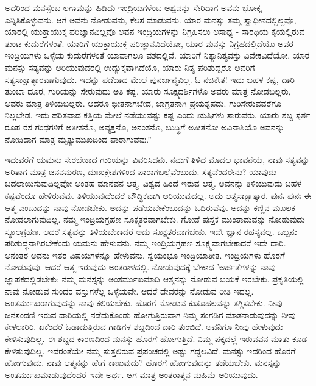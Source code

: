 ಅದರಿಂದ ಮನಸ್ಸೆಂಬ ಲಗಾಮನ್ನು ಹಿಡಿದು ಇಂದ್ರಿಯಗಳೆಂಬ ಅಶ್ವವನ್ನು ಸೇರಿದಾಗ ಅವನು ಭೋಕ್ತೃ ಎನ್ನಿಸಿಕೊಳ್ಳುವನು. ಆಗ ಅವನು ನೋಡುವನು, ಕೆಲಸ ಮಾಡುವನು. ಯಾರ ಮನಸ್ಸು ತಮ್ಮ ಸ್ವಾಧೀನದಲ್ಲಿಲ್ಲವೊ, ಯಾರಲ್ಲಿ ಯುಕ್ತಾಯುಕ್ತ ಪರಿಜ್ಞಾನವಿಲ್ಲವೊ ಅವನ ಇಂದ್ರಿಯಗಳನ್ನು ನಿಗ್ರಹಿಸಲು ಅಸಾಧ್ಯ - ಸಾರಥಿಯ ಕೈಯಲ್ಲಿರುವ ತುಂಟ ಕುದುರೆಗಳಂತೆ. ಯಾರಿಗೆ ಯುಕ್ತಾಯುಕ್ತ ಪರಿಜ್ಞಾನವಿದೆಯೋ, ಯಾರ ಮನಸ್ಸು ನಿಗ್ರಹದಲ್ಲಿದೆಯೊ ಅವರ ಇಂದ್ರಿಯಗಳು ಒಳ್ಳೆಯ ಕುದುರೆಗಳಂತೆ ಯಾವಾಗಲೂ ವಶದಲ್ಲಿವೆ. ಯಾರಿಗೆ ನಿತ್ಯಾನಿತ್ಯವಸ್ತು ವಿವೇಕವಿದೆಯೋ, ಯಾರ ಮನಸ್ಸು ಸತ್ಯವನ್ನು ಅರಿಯುವುದರಲ್ಲಿ ಉದ್ಯುಕ್ತವಾಗಿದೆಯೊ, ಯಾರು ನಿತ್ಯ ಪರಿಶುದ್ದರೊ ಅವರಿಗೆ ಸತ್ಯಸಾಕ್ಷಾತ್ಕಾರವಾಗುವುದು. ಇದನ್ನು ಪಡೆದಾದ ಮೇಲೆ ಪುನರ್ಜನ್ಮವಿಲ್ಲ. ಓ ನಚಿಕೇತ! ಇದು ಬಹಳ ಕಷ್ಟ, ದಾರಿ ತುಂಬಾ ದೂರ, ಗುರಿಯನ್ನು ಸೇರುವುದು ಅತಿ ಕಷ್ಟ. ಯಾರು ಸೂಕ್ಷ್ಮದರ್ಶಿಗಳೊ ಅವರು ಮಾತ್ರ ನೋಡಬಲ್ಲರು, ಅವರು ಮಾತ್ರ ತಿಳಿಯಬಲ್ಲರು. ಆದರೂ ಭೀತನಾಗಬೇಡ, ಜಾಗ್ರತನಾಗಿ ಪ್ರಯತ್ನಪಡು. ಗುರಿಸೇರುವವರೆಗೂ ನಿಲ್ಲಬೇಡ. ಇದು ಹರಿತವಾದ ಕತ್ತಿಯ ಮೇಲೆ ನಡೆಯುವಷ್ಟು ಕಷ್ಟ ಎಂದು ಋಷಿಗಳು ಸಾರುವರು. ಯಾರು ಶಬ್ದ ಸ್ಪರ್ಶ ರೂಪ ರಸ ಗಂಧಗಳಿಗೆ ಅತೀತನೊ, ಅವ್ಯಕ್ತನೊ, ಅನಂತನೊ, ಬುದ್ಧಿಗೆ ಅತೀತನೋ ಅವಿನಾಶಿಯೊ ಅವನನ್ನು ನೋಡಿದಾಗ ಮಾತ್ರ ಮೃತ್ಯುಮುಖದಿಂದ ಪಾರಾಗುವೆವು.”

ಇದುವರೆಗೆ ಯಮನು ಸೇರಬೇಕಾದ ಗುರಿಯನ್ನು ವಿವರಿಸಿದನು. ನಮಗೆ ತಿಳಿದ ಮೊದಲ ಭಾವನೆಯೆ, ನಾವು ಸತ್ಯವನ್ನು ಅರಿತಾಗ ಮಾತ್ರ ಜನನಮರಣ, ದುಃಖಕ್ಲೇಶಗಳಿಂದ ಪಾರಾಗಬಲ್ಲೆವೆಂಬುದು. ಸತ್ಯವೆಂದರೇನು? ಯಾವುದು ಬದಲಾಯಿಸುವುದಿಲ್ಲವೋ ಅಂತಹ ಮಾನವನ ಆತ್ಮ, ವಿಶ್ವದ ಹಿಂದೆ ಇರುವ ಆತ್ಮ. ಅವನನ್ನು ತಿಳಿಯುವುದು ಬಹಳ ಕಷ್ಟವೆಂದೂ ಹೇಳಿರುವೆವು. ತಿಳಿಯುವುದೆಂದರೆ ಬೌದ್ಧಿಕವಾಗಿ ಅರಿಯುವುದಲ್ಲ. ಅದು ಆತ್ಮಸಾಕ್ಷಾತ್ಕಾರ. ಪುನಃ ಪುನಃ ಈ ಆತ್ಮ ಎಂಬುದನ್ನು ನಾವು ನೋಡಬೇಕು. ಅದನ್ನು ಪಡೆಯಬೇಕೆಂಬುದನ್ನು ಓದಿರುವೆವು. ಅದನ್ನು ಕಣ್ಣಿನ ಮೂಲಕ ನೋಡಲಾಗುವುದಿಲ್ಲ. ನಮ್ಮ ಇಂದ್ರಿಯಗ್ರಹಣ ಸೂಕ್ಷ್ಮತರವಾಗಬೇಕು. ಗೋಡೆ ಪುಸ್ತಕ ಮುಂತಾದುವನ್ನು ನೋಡುವುದು ಸ್ಥೂಲಗ್ರಹಣ. ಆದರೆ ಸತ್ಯವನ್ನು ತಿಳಿಯಬೇಕಾದರೆ ಅದು ಸೂಕ್ಷ್ಮತರವಾಗಬೇಕು. ಇದೇ ಜ್ಞಾನ ರಹಸ್ಯವಲ್ಲ. ಒಬ್ಬನು ಪರಿಶುದ್ಧನಾಗಿರಬೇಕೆಂದು ಯಮನು ಹೇಳುವನು. ನಮ್ಮ ಇಂದ್ರಿಯಗ್ರಹಣ ಸೂಕ್ಷ್ಮವಾಗಬೇಕಾದರೆ ಇದೇ ದಾರಿ. ಅನಂತರ ಅವನು ಇತರ ವಿಷಯಗಳನ್ನೂ ಹೇಳುವನು. ಸ್ವಯಂಭೂ ಇಂದ್ರಿಯಾತೀತ. ಇಂದ್ರಿಯಗಳು ಹೊರಗೆ ನೋಡುವುವು. ಆದರೆ ಆತ್ಮ ಇರುವುದು ಅಂತರಾಳದಲ್ಲಿ. ನೋಡುವುದಕ್ಕೆ ಬೇಕಾದ 'ಅರ್ಹತೆಗಳನ್ನು ನಾವು ಜ್ಞಾಪಕದಲ್ಲಿಡಬೇಕು: ನಮ್ಮ ಮನಸ್ಸನ್ನು ಅಂತರ್ಮುಖಮಾಡಿ ಆತ್ಮನನ್ನು ನೋಡುವ ಬಯಕೆ ಇರಬೇಕು. ಪ್ರಕೃತಿಯಲ್ಲಿ ನಾವು ನೋಡುವ ಸುಂದರ ವಸ್ತುಗಳೆಲ್ಲ ಒಳ್ಳೆಯವೇ. ಆದರೆ ದೇವರನ್ನು ನೋಡುವ ರೀತಿ ಇದಲ್ಲ. ಅಂತರ್ಮುಖರಾಗುವುದನ್ನು ನಾವು ಕಲಿಯಬೇಕು. ಹೊರಗೆ ನೋಡುವ ಕುತೂಹಲವನ್ನು ತಗ್ಗಿಸಬೇಕು. ನೀವು ಜನಸಂದಣಿ ಇರುವ ದಾರಿಯಲ್ಲಿ ನಡೆದುಕೊಂಡು ಹೋಗುತ್ತಿರುವಾಗ ನಿಮ್ಮ ಸಂಗಡಿಗ ಮಾತನಾಡುವುದನ್ನು ನೀವು ಕೇಳಲಾರಿರಿ. ಏಕೆಂದರೆ ಓಡಾಡುತ್ತಿರುವ ಗಾಡಿಗಳ ಶಬ್ದದಿಂದ ದಾರಿ ತುಂಬಿದೆ. ಅವನಿಗೂ ನೀವು ಹೇಳುವುದು ಕೇಳಿಸುವುದಿಲ್ಲ. ಈ ಶಬ್ದದ ಕಾರಣದಿಂದ ಮನಸ್ಸು ಹೊರಗೆ ಹೋಗುತ್ತಿದೆ. ನಿಮ್ಮ ಪಕ್ಕದಲ್ಲೆ ಇರುವವನ ಮಾತು ಕೂಡ ಕೇಳಿಸುವುದಿಲ್ಲ. ಇದರಂತೆಯೇ ನಮ್ಮ ಸುತ್ತಲಿರುವ ಪ್ರಪಂಚದಲ್ಲಿ ಅಷ್ಟು ಗದ್ದಲವಿದೆ. ಮನಸ್ಸು ಇದರಿಂದ ಹೊರಗೆ ಹೋಗುವುದು. ನಾವು ಆತ್ಮನನ್ನು ಹೇಗೆ ಕಾಣುವುದು? ಹೊರಗೆ ಹೋಗುವುದನ್ನು ತಡೆಯಬೇಕು. ಮನಸ್ಸನ್ನು ಅಂತರ್ಮುಖಮಾಡುವುದೆಂದರೆ ಇದೇ ಅರ್ಥ. ಆಗ ಮಾತ್ರ ಅಂತರಾತ್ಮನ ಮಹಿಮೆ ಅರಿಯುವುದು.

